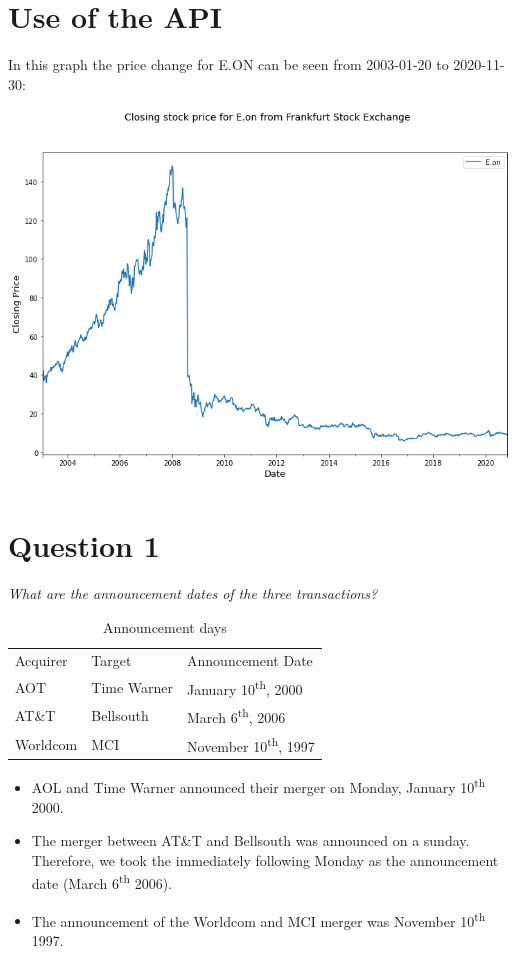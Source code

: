
\section{Use of the API}
\label{key}
In this graph the price change for E.ON can be seen from 2003-01-20 to 2020-11-30:\newline
\begin{center}
\includegraphics[scale=0.5]{images/Stock_Eon.png}
\end{center}


\newpage

\section{Question 1}
\textit{What are the announcement dates of the three transactions?}
\begin{table}[H]
    \centering
    \begin{tabular}{|l|l|l|}
    \thickhline
         Acquirer & Target & Announcement Date \\\thickhline
         AOT& Time Warner & January 10\textsuperscript{th}, 2000 \\
         AT\&T& Bellsouth& March 6\textsuperscript{th}, 2006\\
        Worldcom& MCI& November 10\textsuperscript{th}, 1997\\ \hline
    \end{tabular}
    \caption{Announcement days}
    \label{aanounce}
\end{table}
\begin{itemize}
    \item AOL and Time Warner announced their merger on Monday, January 10\textsuperscript{th} 2000.
    \item The merger between AT\&T and Bellsouth was announced on a sunday. Therefore, we took the immediately following Monday as the announcement date (March 6\textsuperscript{th} 2006).
    \item The announcement of the Worldcom and MCI merger was November 10\textsuperscript{th} 1997.
\end{itemize}

